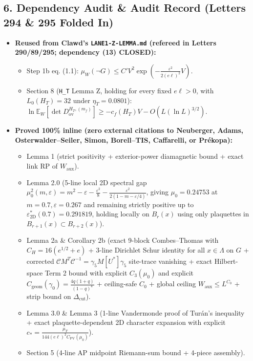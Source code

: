\documentclass[11pt,a4paper]{article}
\begin{document}
\subsection*{6. Dependency Audit \& Audit Record (Letters 294 \& 295 Folded In)}
\begin{itemize}
\item{} {\bfseries\boldmath Reused from Clawd's \texttt{LANE1-Z-LEMMA.md} (refereed in Letters 290/89/295; dependency (13) CLOSED):}
\begin{itemize}
\item{} Step 1b eq. (1.1): $\mu_W(\neg G) \le C' V^2 \exp(-\frac{\varepsilon^2}{2(e\ell)^2} V)$.
\item{} Section 8 (\texttt{H\_T} Lemma Z, holding for every fixed $e\ell > 0$, with $L_0(H_T) = 32$ under $\eta_T = 0.0801$): $\ln \mathbb{E}_W[\det D_{\text{ov}}^{H_T, (m_f)}] \ge -c_f(H_T) V - O(L (\ln L)^{3/2})$.
\end{itemize}

\item{} {\bfseries\boldmath Proved 100\% inline (zero external citations to Neuberger, Adams, Osterwalder--Seiler, Simon, Borell--TIS, Caffarelli, or Pr\'ekopa):}
\begin{itemize}
\item{} Lemma 1 (strict positivity + exterior-power diamagnetic bound + exact link RP of $W_{\text{aux}}$).
\item{} Lemma 2.0 (5-line local 2D spectral gap $\mu_0^2(m, \varepsilon) = m^2 - \varepsilon - \frac{\varepsilon^2}{8} - \frac{\varepsilon^2}{2(1 - m - \varepsilon/4)}$, giving $\mu_0 = 0.24753$ at $m = 0.7, \varepsilon = 0.267$ and remaining strictly positive up to $\varepsilon_{\text{2D}}^*(0.7) = 0.291819$, holding locally on $B_r(x)$ using only plaquettes in $B_{r+1}(x) \subset B_{r+2}(x)$).
\item{} Lemma 2a \& Corollary 2b (exact 9-block Combes--Thomas with $C_H = 16(e^{1/2} + e)$ + 3-line Dirichlet Schur identity for all $x \in \Lambda$ on $G$ + corrected $\mathcal{C} M^T \mathcal{C}^{-1} = \gamma_5 M[U^*] \gamma_5$ site-trace vanishing + exact Hilbert-space Term 2 bound with explicit $C_3(\mu_0)$ and explicit $C_{\text{geom}}(\gamma_0) = \frac{4q(1+q)}{(1-q)^4}$ + ceiling-safe $C_0$ + global ceiling $W_{\text{aux}} \le L^{C_0}$ + strip bound on $\Delta_{\text{cut}}$).
\item{} Lemma 3.0 \& Lemma 3 (1-line Vandermonde proof of Tur\'an's inequality + exact plaquette-dependent 2D character expansion with explicit $c_* = \frac{\mu_T}{144(e\ell)^2 C_{\text{PV}}(\mu_0)}$).
\item{} Section 5 (4-line AP midpoint Riemann-sum bound + 4-piece assembly).
\end{itemize}


\end{itemize}
\end{document}
